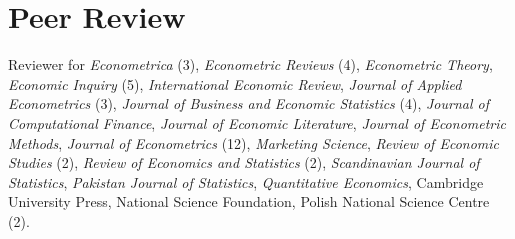 \documentclass[10pt,letterpaper]{article}
\begin{document}

\section*{Peer Review}

Reviewer for
\textit{Econometrica} (3),
\textit{Econometric Reviews} (4),
\textit{Econometric Theory},
\textit{Economic Inquiry} (5),
\textit{International Economic Review},
\textit{Journal of Applied Econometrics} (3),
\textit{Journal of Business and Economic Statistics} (4),
\textit{Journal of Computational Finance},
\textit{Journal of Economic Literature},
\textit{Journal of Econometric Methods},
\textit{Journal of Econometrics} (12),
\textit{Marketing Science},
\textit{Review of Economic Studies} (2),
\textit{Review of Economics and Statistics} (2),
\textit{Scandinavian Journal of Statistics},
\textit{Pakistan Journal of Statistics},
\textit{Quantitative Economics},
Cambridge University Press,
National Science Foundation,
Polish National Science Centre (2).
\end{document}
